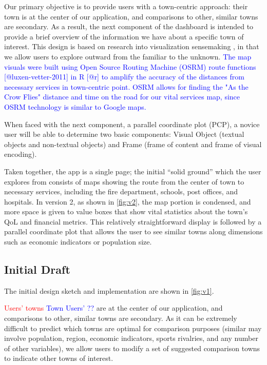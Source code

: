 \documentclass[letterpaper,inpress]{jdsart}
\begin{document}
Our primary objective is to provide users with a town-centric approach: their town is at the center of our application, and comparisons to other, similar towns are secondary. As a result, the next component of the dashboard is intended to provide a brief overview of the information we have about a specific town of interest. This design is based on research into visualization sensemaking \citep{lee}, in that we allow users to explore outward from the familiar to the unknown. {\textcolor{blue}{The map visuals were built using Open Source Routing Machine (OSRM) route functions [@luxen-vetter-2011] in R [@r] to amplify the accuracy of the distances from necessary services in town-centric point. OSRM allows for finding the "As the Crow Flies" distance and time on the road for our vital services map, since OSRM technology is similar to Google maps.}}

When faced with the next component, a parallel coordinate plot (PCP), a novice user will be able to determine two basic components: Visual Object (textual objects and non-textual objects) and Frame (frame of content and frame of visual encoding).

Taken together, the app is a single page; the initial ``solid ground'' which the user explores from consists of maps showing the route from the center of town to necessary services, including the fire department, schools, post offices, and hospitals. In version 2, as shown in \autoref{fig:v2}, the map portion is condensed, and more space is given to value boxes that show vital statistics about the town's QoL and financial metrics. This relatively straightforward display is followed by a parallel coordinate plot that allows the user to see similar towns along dimensions such as economic indicators or population size.

\subsection{Initial Draft}

The initial design sketch and implementation are shown in \autoref{fig:v1}.

{\textcolor{red}{Users' towns}} {\textcolor{blue}{Town Users' ??}} are at the center of our application, and comparisons to other, similar towns are secondary. As it can be extremely difficult to predict which towns are optimal for comparison purposes (similar may involve population, region, economic indicators, sports rivalries, and any number of other variables), we allow users to modify a set of suggested comparison towns to indicate other towns of interest.
\end{document}
